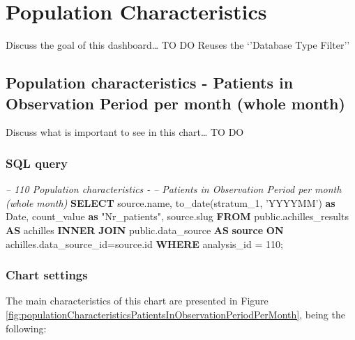 \documentclass[]{book}
\newenvironment{Shaded}{\begin{snugshade}}{\end{snugshade}}
\newcommand{\KeywordTok}[1]{\textcolor[rgb]{0.13,0.29,0.53}{\textbf{#1}}}
\newcommand{\DataTypeTok}[1]{\textcolor[rgb]{0.13,0.29,0.53}{#1}}
\newcommand{\DecValTok}[1]{\textcolor[rgb]{0.00,0.00,0.81}{#1}}
\newcommand{\StringTok}[1]{\textcolor[rgb]{0.31,0.60,0.02}{#1}}
\newcommand{\CommentTok}[1]{\textcolor[rgb]{0.56,0.35,0.01}{\textit{#1}}}
\newcommand{\OtherTok}[1]{\textcolor[rgb]{0.56,0.35,0.01}{#1}}
\newcommand{\FunctionTok}[1]{\textcolor[rgb]{0.00,0.00,0.00}{#1}}
\newcommand{\NormalTok}[1]{#1}
\begin{document}
\chapter{Population Characteristics}\label{population-characteristics}

Discuss the goal of this dashboard\ldots{} TO DO Reuses the `'Database
Type Filter''

\section{Population characteristics - Patients in Observation Period per
month (whole
month)}\label{population-characteristics---patients-in-observation-period-per-month-whole-month}

Discuss what is important to see in this chart\ldots{} TO DO

\subsection{SQL query}\label{sql-query-10}

\begin{Shaded}
\begin{Highlighting}[]
\CommentTok{-- 110    Population characteristics - }
\CommentTok{-- Patients in Observation Period per month (whole month)}
\KeywordTok{SELECT}\NormalTok{ source.name, }
       \FunctionTok{to_date}\NormalTok{(stratum_1, }\StringTok{'YYYYMM'}\NormalTok{) }\KeywordTok{as} \DataTypeTok{Date}\NormalTok{,}
\NormalTok{       count_value }\KeywordTok{as} \OtherTok{"Nr_patients"}\NormalTok{,}
\NormalTok{       source.slug}
\KeywordTok{FROM}\NormalTok{ public.achilles_results }\KeywordTok{AS}\NormalTok{ achilles }
    \KeywordTok{INNER} \KeywordTok{JOIN}\NormalTok{ public.data_source }\KeywordTok{AS} \KeywordTok{source} \KeywordTok{ON} 
\NormalTok{      achilles.data_source_id=source.id}
\KeywordTok{WHERE}\NormalTok{ analysis_id = }\DecValTok{110}\NormalTok{;}
\end{Highlighting}
\end{Shaded}

\subsection{Chart settings}\label{chart-settings-10}

The main characteristics of this chart are presented in Figure
\ref{fig:populationCharacteristicsPatientsInObservationPeriodPerMonth},
being the following:
\end{document}
